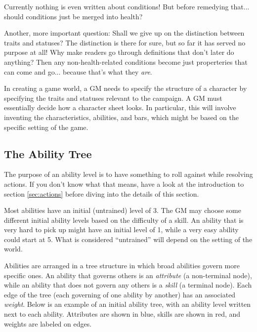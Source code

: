 \documentclass[12pt]{article}
\newcommand{\notes}[1]{{\color{Tan} #1}}
\begin{document}
\notes{Currently nothing is even written about conditions!
But before remedying that... should conditions just be merged into health?}

\notes{Another, more important question:
Shall we give up on the distinction between traits and statuses?
The distinction is there for sure, but so far it has served no purpose at all!
Why make readers go through definitions that don't later do anything?
Then any non-health-related conditions become just properteries that can come and go... because that's what they \emph{are}.}

In creating a game world, a GM needs to specify the structure of a character by specifying the traits and statuses relevant to the campaign. A GM must essentially decide how a character sheet looks. In particular, this will involve inventing the characteristics, abilities, and bars, which might be based on the specific setting of the game.

\subsection{The Ability Tree}\label{sec:tree}			

The purpose of an ability level is to have something to roll against while resolving actions. If you don't know what that means, have a look at the introduction to section \ref{sec:actions} before diving into the details of this section.

Most abilities have an initial (untrained) level of 3. The GM may choose some different initial ability levels based on the difficulty of a skill. An ability that is very hard to pick up might have an initial level of 1, while a very easy ability could start at 5. What is considered ``untrained'' will depend on the setting of the world.

Abilities are arranged in a tree structure in which broad abilities govern more specific ones.
An ability that governs others is an \emph{attribute} (a non-terminal node), while an ability that does not govern any others is a \emph{skill} (a terminal node).
Each edge of the tree (each governing of one ability by another) has an associated \emph{weight}.
Below is an example of an initial ability tree, with an ability level written next to each ability.
Attributes are shown in blue, skills are shown in red, and weights are labeled on edges.

\begin{center}

\end{center}
\end{document}
